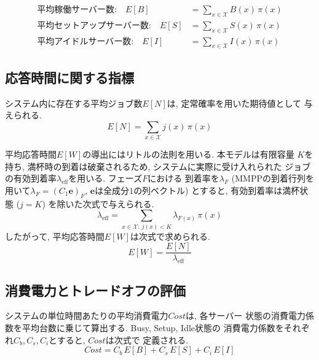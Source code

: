 \documentclass[a4paper, 11pt, dvipdfmx]{jsreport}
\begin{document}
\begin{align}
    \text{平均稼働サーバー数:} \quad
        E[B] &= \sum_{x \in \mathcal{X}} B(x)\, \pi(x) \\
    \text{平均セットアップサーバー数:} \quad
        E[S] &= \sum_{x \in \mathcal{X}} S(x)\, \pi(x) \\
    \text{平均アイドルサーバー数:} \quad
        E[I] &= \sum_{x \in \mathcal{X}} I(x)\, \pi(x)
\end{align}


\subsection{応答時間に関する指標}
\label{sec:metric-response}

システム内に存在する平均ジョブ数$E[N]$は, 定常確率を用いた期待値として
与えられる. 
\begin{equation}
    E[N] = \sum_{x \in \mathcal{X}} j(x)\, \pi(x)
\end{equation}

平均応答時間$E[W]$の導出にはリトルの法則を用いる. 本モデルは有限容量
$K$を持ち, 満杯時の到着は破棄されるため, システムに実際に受け入れられた
ジョブの有効到着率$\lambda_{\mathrm{eff}}$を用いる. フェーズ$F$における
到着率を$\lambda_F$ (MMPPの到着行列を用いて$\lambda_F = (C_1 \bm{e})_F$, $\bm{e}$は全成分$1$の列ベクトル) とすると, 有効到着率は満杯状態 ($j=K$) を除いた次式で与えられる. 
\begin{equation}
    \lambda_{\mathrm{eff}} = \sum_{x \in \mathcal{X}:\, j(x) < K}
        \lambda_{F(x)}\, \pi(x)
\end{equation}
したがって, 平均応答時間$E[W]$は次式で求められる. 
\begin{equation}
    E[W] = \frac{E[N]}{\lambda_{\mathrm{eff}}}
\end{equation}

\subsection{消費電力とトレードオフの評価}
\label{sec:metric-cost}

システムの単位時間あたりの平均消費電力$\mathit{Cost}$は, 各サーバー
状態の消費電力係数を平均台数に乗じて算出する. Busy, Setup, Idle状態の
消費電力係数をそれぞれ$C_b, C_s, C_i$とすると, $\mathit{Cost}$は次式で
定義される. 
\begin{equation}
    \mathit{Cost} = C_b\, E[B] + C_s\, E[S] + C_i\, E[I]
\end{equation}
\end{document}
